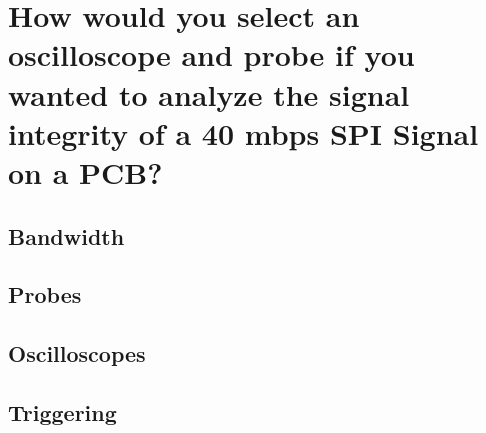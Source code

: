 \documentclass[main.tex]{subfiles}
\begin{document}
\section{How would you select an oscilloscope and probe if you wanted to analyze the signal integrity of a 40 mbps SPI Signal on a PCB?}

\subsection{Bandwidth}

\subsection{Probes}

\subsection{Oscilloscopes}

\subsection{Triggering}
\end{document}
